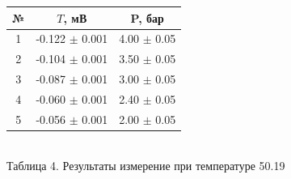 \documentclass[a4paper, 12pt]{article}
\begin{document}
	\begin{center}
	\begin{tabular} {|c | c |c |}
		\hline	
		№ & $T$, мВ &  P, бар \\
		\hline
		1 & -0.122
		 $\pm$ 0.001 & 4.00 $\pm$ 0.05  \\
		\hline
		2 & -0.104
		 $\pm$ 0.001 & 3.50 $\pm$ 0.05  \\
		\hline
		3 & -0.087
		 $\pm$ 0.001 & 3.00 $\pm$ 0.05  \\
		\hline
		4 & -0.060
		 $\pm$ 0.001 & 2.40 $\pm$ 0.05  \\
		\hline
		5 & -0.056 $\pm$ 0.001 & 2.00 $\pm$ 0.05  \\
		\hline
	\end{tabular}\\
	Таблица 4. Результаты измерение при температуре 50.19 \textcelsius
\end{center}
\end{document}

